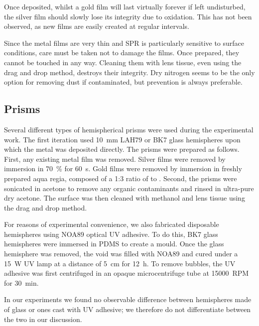 Once deposited, whilst a gold film will last virtually forever if left
undisturbed, the silver film should slowly lose its integrity due to
oxidation.  This has not been observed, as new films are easily created at
regular intervals.  

Since the metal films are very thin and SPR is particularly sensitive to
surface conditions, care must be taken not to damage the films.  Once
prepared, they cannot be touched in any way.  Cleaning them with lens
tissue, even using the drag and drop method, destroys their integrity.  Dry
nitrogen seems to be the only option for removing dust if contaminated, but
prevention is always preferable.

\subsection{Prisms}
Several different types of hemispherical prisms were used during the
experimental work.  The first iteration used \SI{10}{\milli\meter} LAH79 or
BK7 glass hemispheres upon which the metal was deposited directly.  The
prisms were prepared as follows.  First, any existing metal film was
removed.  Silver films were removed by immersion in \SI{70}{\percent}
 for \SI{60}{\second}.  Gold films were removed by immersion in
freshly prepared aqua regia, composed of a 1:3 ratio of  to
.  Second, the prisms were sonicated in acetone to remove any
organic contaminants and rinsed in ultra-pure dry acetone.  The surface was
then cleaned with methanol and lens tissue using the drag and drop method.

For reasons of experimental convenience, we also fabricated disposable
hemispheres using NOA89 optical UV adhesive.  To do this, BK7 glass
hemispheres were immersed in PDMS to create a mould.  Once the glass
hemisphere was removed, the void was filled with NOA89 and cured under a
\SI{15}{\watt} UV lamp at a distance of \SI{5}{\centi\meter} for
\SI{12}{\hour}.  To remove bubbles, the UV adhesive was first centrifuged
in an opaque microcentrifuge tube at \SI{15000}{RPM} for \SI{30}{\minute}.

In our experiments we found no observable difference between hemispheres
made of glass or ones cast with UV adhesive; we therefore do not
differentiate between the two in our discussion.  
